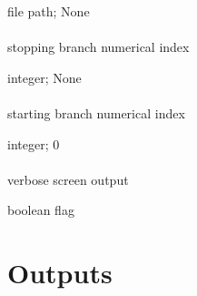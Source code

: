 \documentclass[letterpaper,12pt,english]{sphinxmanual}
\begin{document}
 file path;  None


\subsubsection{}
\label{\detokenize{prog_desc:id18}}
 stopping branch numerical index

 integer;  None


\subsubsection{}
\label{\detokenize{prog_desc:id19}}
 starting branch numerical index

 integer;  0


\subsubsection{}
\label{\detokenize{prog_desc:id20}}
 verbose screen output

 boolean flag


\chapter{Outputs}
\label{\detokenize{output::doc}}\label{\detokenize{output:outputs}}\label{\detokenize{output:intro}}
\end{document}
